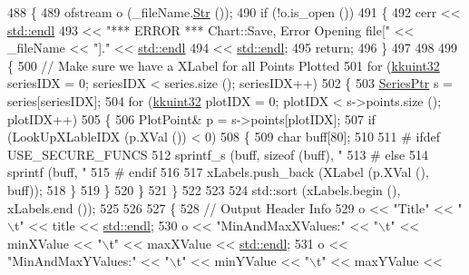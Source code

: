 \begin{DoxyCode}
488 \{
489   ofstream  o (\_fileName.\hyperlink{class_k_k_b_1_1_k_k_str_ad574e6c0fe7f6ce1ba3ab0a8ce2fbd52}{Str} ());
490   \textcolor{keywordflow}{if}  (!o.is\_open ())
491   \{
492     cerr << \hyperlink{namespace_k_k_b_ad1f50f65af6adc8fa9e6f62d007818a8}{std::endl}
493          << \textcolor{stringliteral}{"*** ERROR ***     Chart::Save,    Error Opening file["} << \_fileName << \textcolor{stringliteral}{"]."} << 
      \hyperlink{namespace_k_k_b_ad1f50f65af6adc8fa9e6f62d007818a8}{std::endl}
494          << \hyperlink{namespace_k_k_b_ad1f50f65af6adc8fa9e6f62d007818a8}{std::endl};
495     \textcolor{keywordflow}{return};
496   \}
497 
498 
499   \{
500     \textcolor{comment}{// Make sure we have a XLabel for all Points Plotted}
501     \textcolor{keywordflow}{for}  (\hyperlink{namespace_k_k_b_af8d832f05c54994a1cce25bd5743e19a}{kkuint32} seriesIDX = 0;  seriesIDX < series.size ();  seriesIDX++)
502     \{
503       \hyperlink{class_k_k_b_1_1_chart_1_1_series}{SeriesPtr} s = series[seriesIDX];
504       \textcolor{keywordflow}{for}  (\hyperlink{namespace_k_k_b_af8d832f05c54994a1cce25bd5743e19a}{kkuint32}  plotIDX = 0;  plotIDX < s->points.size ();  plotIDX++)
505       \{
506         PlotPoint& p = s->points[plotIDX];
507         \textcolor{keywordflow}{if}  (LookUpXLableIDX (p.XVal ()) < 0)
508         \{
509           \textcolor{keywordtype}{char}  buff[80];
510 
511 \textcolor{preprocessor}{#         ifdef  USE\_SECURE\_FUNCS}
512             sprintf\_s (buff, \textcolor{keyword}{sizeof} (buff), \textcolor{stringliteral}{"%
513 \textcolor{preprocessor}{#         else}
514             sprintf (buff, \textcolor{stringliteral}{"%
515 \textcolor{preprocessor}{#         endif}
516 
517           xLabels.push\_back (XLabel (p.XVal (), buff));
518         \}
519       \}
520     \}
521   \}
522 
523 
524   std::sort (xLabels.begin (), xLabels.end ());
525 
526 
527   \{
528     \textcolor{comment}{// Output Header Info}
529     o << \textcolor{stringliteral}{"Title"} << \textcolor{stringliteral}{"\(\backslash\)t"} << title << \hyperlink{namespace_k_k_b_ad1f50f65af6adc8fa9e6f62d007818a8}{std::endl};
530     o << \textcolor{stringliteral}{"MinAndMaxXValues:"} << \textcolor{stringliteral}{"\(\backslash\)t"} << minXValue << \textcolor{stringliteral}{"\(\backslash\)t"} << maxXValue << 
      \hyperlink{namespace_k_k_b_ad1f50f65af6adc8fa9e6f62d007818a8}{std::endl};
531     o << \textcolor{stringliteral}{"MinAndMaxYValues:"} << \textcolor{stringliteral}{"\(\backslash\)t"} << minYValue << \textcolor{stringliteral}{"\(\backslash\)t"} << maxYValue << 
}}
\end{DoxyCode}
